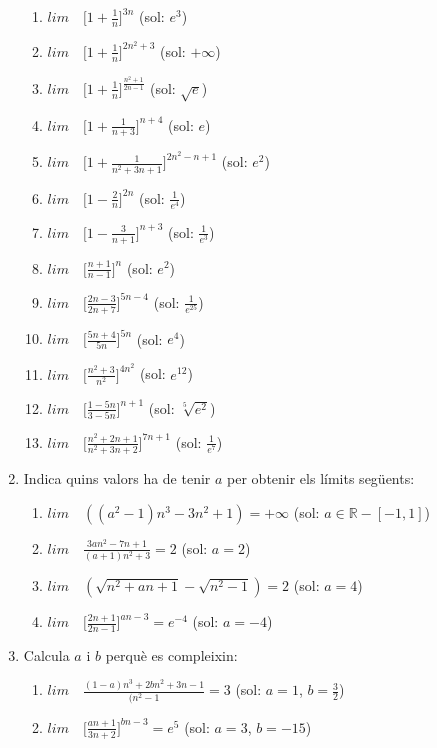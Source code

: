 \documentclass{article}
\begin{document}
\begin{enumerate}
\begin{enumerate}
\item $lim \quad \Big[1+\frac{1}{n}\Big]^{3n}$ (sol: $e^3$)
\item $lim \quad \Big[1+\frac{1}{n}\Big]^{2n^2+3}$ (sol: $+\infty$)
\item $lim \quad \Big[1+\frac{1}{n}\Big]^{\frac{n^2+1}{2n-1}}$ (sol: $\sqrt{e}$)
\item $lim \quad \Big[1+\frac{1}{n+3}\Big]^{n+4}$ (sol: $e$)
\item $lim \quad \Big[1+\frac{1}{n^2+3n+1}\Big]^{2n^2-n+1}$ (sol: $e^2$)
\item $lim \quad \Big[1-\frac{2}{n}\Big]^{2n}$ (sol: $\frac{1}{e^4}$)
\item $lim \quad \Big[1-\frac{3}{n+1}\Big]^{n+3}$ (sol: $\frac{1}{e^3}$)
\item $lim \quad \Big[\frac{n+1}{n-1}\Big]^{n}$ (sol: $e^2$)
\item $lim \quad \Big[\frac{2n-3}{2n+7}\Big]^{5n-4}$ (sol: $\frac{1}{e^25}$)
\item $lim \quad \Big[\frac{5n+4}{5n}\Big]^{5n}$ (sol: $e^4$)
\item $lim \quad \Big[\frac{n^2+3}{n^2}\Big]^{4n^2}$ (sol: $e^{12}$)
\item $lim \quad \Big[\frac{1-5n}{3-5n}\Big]^{n+1}$ (sol: $\sqrt[5]{e^2}$)
\item $lim \quad \Big[\frac{n^2+2n+1}{n^2+3n+2}\Big]^{7n+1}$ (sol: $\frac{1}{e^7}$)
\end{enumerate}

\item Indica quins valors ha de tenir $a$ per obtenir els límits següents:

\begin{enumerate}
	\item $lim \quad ((a^2-1)n^3-3n^2+1)=+\infty$ (sol: $a\in \mathbb{R}-[-1,1]$)
	\item $lim \quad \frac{3an^2-7n+1}{(a+1)n^2+3}=2$ (sol: $a=2$)
	\item $lim \quad (\sqrt{n^2+an+1}-\sqrt{n^2-1})=2$ (sol: $a=4$)
	\item $lim \quad \Big[\frac{2n+1}{2n-1}\Big]^{an-3}=e^{-4}$ (sol: $a=-4$)
\end{enumerate}

\item Calcula $a$ i $b$ perquè es compleixin:

\begin{enumerate}

	\item $lim \quad \frac{(1-a)n^3+2bn^2+3n-1}{(n^2-1}=3$ (sol: $a=1$, $b=\frac{3}{2}$)
	\item $lim \quad \Big[\frac{an+1}{3n+2}\Big]^{bn-3}=e^{5}$ (sol: $a=3$, $b=-15$)
\end{enumerate}


\end{enumerate}
\end{document}
